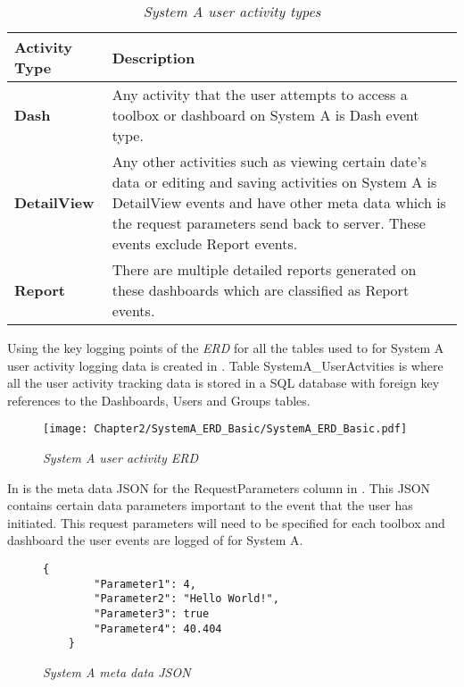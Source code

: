 \begin{table}[!htb]
	\centering
	\small
	\caption[System A user activity types]
	{\textit{System A user activity types}}
	\label{tbl:Ch2_SystemA_EventTypes}
	\begin{tabularx}{\textwidth}{|l|X|}
		\hline \textbf{Activity Type} & \textbf{Description} \\
		\hline \textbf{Dash} & Any activity that the user attempts to access a toolbox or dashboard on System A is Dash event type. \\
		\hline \textbf{DetailView} & Any other activities such as viewing certain date's data or editing and saving activities on System A is DetailView events and have other meta data which is the request parameters send back to server. These events exclude Report events. \\
		\hline \textbf{Report} & There are multiple detailed reports generated on these dashboards which are classified as Report events. \\
		\hline
	\end{tabularx}
\end{table}

Using the key logging points of  the \emph{ERD} for all the tables used to for System A user activity logging data is created in . Table SystemA\_UserActvities is where all the user activity tracking data is stored in a SQL database with foreign key references to the Dashboards, Users and Groups tables.

\begin{figure}[!htb] %
	\centering %
	\texttt{[image: Chapter2/SystemA\_ERD\_Basic/SystemA\_ERD\_Basic.pdf]}
	\caption[System A user activity ERD]
	{\textit{System A user activity ERD}}\label{fig:Ch2_SystemA_Basic_ERD}
\end{figure}

\clearpage

In  is the meta data JSON for the RequestParameters column in . This JSON contains certain data parameters important to the event that the user has initiated. This request parameters will need to be specified for each toolbox and dashboard the user events are logged of for System A.

\begin{figure}[!htb]
	\centering
	\begin{lstlisting}[style=json] 
	{
		"Parameter1": 4,
		"Parameter2": "Hello World!",
		"Parameter3": true
		"Parameter4": 40.404
	}
	\end{lstlisting}
	\caption[System A meta data JSON]
	{\textit{System A meta data JSON}}\label{fig:CH2_SystemAMetaData}
\end{figure}

